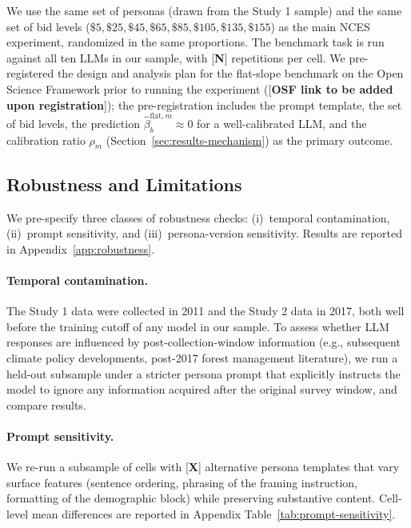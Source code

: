 \documentclass[12pt]{article}
\begin{document}
We use the same set of personas (drawn from the Study 1 sample) and the same set of bid levels ($\$5, \$25, \$45, \$65, \$85, \$105, \$135, \$155$) as the main NCES experiment, randomized in the same proportions. The benchmark task is run against all ten LLMs in our sample, with [\textbf{N}] repetitions per cell. We pre-registered the design and analysis plan for the flat-slope benchmark on the Open Science Framework prior to running the experiment ([\textbf{OSF link to be added upon registration}]); the pre-registration includes the prompt template, the set of bid levels, the prediction $\hat{\beta}_b^{\text{flat}, m} \approx 0$ for a well-calibrated LLM, and the calibration ratio $\rho_m$ (Section~\ref{sec:results-mechanism}) as the primary outcome.

\subsection{Robustness and Limitations}\label{sec:methods-robustness}

We pre-specify three classes of robustness checks: (i)~temporal contamination, (ii)~prompt sensitivity, and (iii)~persona-version sensitivity. Results are reported in Appendix~\ref{app:robustness}.

\paragraph{Temporal contamination.} The Study 1 data were collected in 2011 and the Study 2 data in 2017, both well before the training cutoff of any model in our sample. To assess whether LLM responses are influenced by post-collection-window information (e.g., subsequent climate policy developments, post-2017 forest management literature), we run a held-out subsample under a stricter persona prompt that explicitly instructs the model to ignore any information acquired after the original survey window, and compare results.

\paragraph{Prompt sensitivity.} We re-run a subsample of cells with [\textbf{X}] alternative persona templates that vary surface features (sentence ordering, phrasing of the framing instruction, formatting of the demographic block) while preserving substantive content. Cell-level mean differences are reported in Appendix Table~\ref{tab:prompt-sensitivity}.
\end{document}
